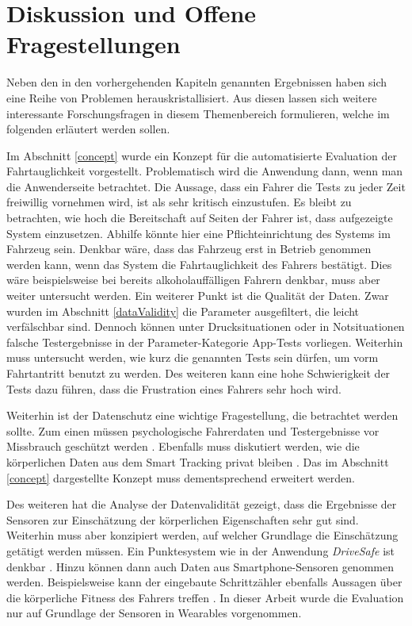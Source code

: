 \section{Diskussion und Offene Fragestellungen}
\label{openChallenges}

Neben den in den vorhergehenden Kapiteln genannten Ergebnissen haben sich eine Reihe von Problemen herauskristallisiert. Aus diesen lassen sich weitere interessante Forschungsfragen in diesem Themenbereich formulieren, welche im folgenden erläutert werden sollen.

Im Abschnitt \ref{concept} wurde ein Konzept für die automatisierte Evaluation der Fahrtauglichkeit vorgestellt. Problematisch wird die Anwendung dann, wenn man die Anwenderseite betrachtet. Die Aussage, dass ein Fahrer die Tests zu jeder Zeit freiwillig vornehmen wird, ist als sehr kritisch einzustufen. Es bleibt zu betrachten, wie hoch die Bereitschaft auf Seiten der Fahrer ist, dass aufgezeigte System einzusetzen. Abhilfe könnte hier eine Pflichteinrichtung des Systems im Fahrzeug sein. Denkbar wäre, dass das Fahrzeug erst in Betrieb genommen werden kann, wenn das System die Fahrtauglichkeit des Fahrers bestätigt. Dies wäre beispielsweise bei bereits alkoholauffälligen Fahrern denkbar, muss aber weiter untersucht werden. Ein weiterer Punkt ist die Qualität der Daten. Zwar wurden im Abschnitt \ref{dataValidity} die Parameter ausgefiltert, die leicht verfälschbar sind. Dennoch können unter Drucksituationen oder in Notsituationen falsche Testergebnisse in der Parameter-Kategorie App-Tests vorliegen. Weiterhin muss untersucht werden, wie kurz die genannten Tests sein dürfen, um vorm Fahrtantritt benutzt zu werden. Des weiteren kann eine hohe Schwierigkeit der Tests dazu führen, dass die Frustration eines Fahrers sehr hoch wird. 

Weiterhin ist der Datenschutz eine wichtige Fragestellung, die betrachtet werden sollte. Zum einen müssen psychologische Fahrerdaten und Testergebnisse vor Missbrauch geschützt werden \cite{beurteilungskriterienleipzig}. Ebenfalls muss diskutiert werden, wie die körperlichen Daten aus dem Smart Tracking privat bleiben \cite{securityprivacyfitnesstracking}. Das im Abschnitt \ref{concept} dargestellte Konzept muss dementsprechend erweitert werden.

Des weiteren hat die Analyse der Datenvalidität gezeigt, dass die Ergebnisse der Sensoren zur Einschätzung der körperlichen Eigenschaften sehr gut sind. Weiterhin muss aber konzipiert werden, auf welcher Grundlage die Einschätzung getätigt werden müssen. Ein Punktesystem wie in der Anwendung \textit{DriveSafe} ist denkbar \cite{drivesafe}. Hinzu können dann auch Daten aus Smartphone-Sensoren genommen werden. Beispielsweise kann der eingebaute Schrittzähler ebenfalls Aussagen über die körperliche Fitness des Fahrers treffen \cite{validationphysicalactivitytracking,bewegungserkennungsensoren}. In dieser Arbeit wurde die Evaluation nur auf Grundlage der Sensoren in Wearables vorgenommen.

